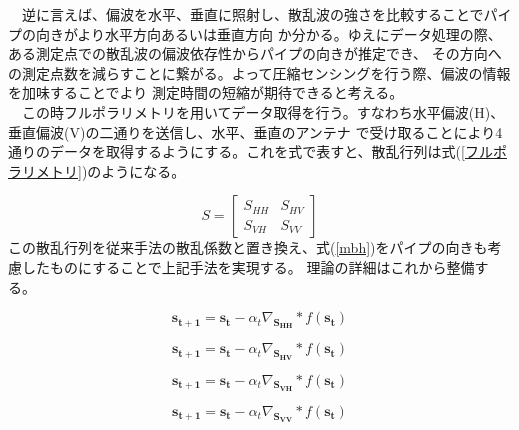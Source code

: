 \documentclass[12pt,a4paper]{jsreport}
\begin{document}
　逆に言えば、偏波を水平、垂直に照射し、散乱波の強さを比較することでパイプの向きがより水平方向あるいは垂直方向
か分かる。ゆえにデータ処理の際、ある測定点での散乱波の偏波依存性からパイプの向きが推定でき、
その方向への測定点数を減らすことに繋がる。よって圧縮センシングを行う際、偏波の情報を加味することでより
測定時間の短縮が期待できると考える。
\\　この時フルポラリメトリを用いてデータ取得を行う。すなわち水平偏波(H)、垂直偏波(V)の二通りを送信し、水平、垂直のアンテナ
で受け取ることにより4通りのデータを取得するようにする。これを式で表すと、散乱行列は式(\ref{フルポラリメトリ})のようになる。

\begin{equation}
  S =
      \left[
      \begin{array}{rrr}
      S_{HH} & S_{HV}  \\
      S_{VH} & S_{VV} 
      
      \end{array}
      \right]\label{フルポラリメトリ}
  \end{equation}
この散乱行列を従来手法の散乱係数と置き換え、式(\ref{mbh})をパイプの向きも考慮したものにすることで上記手法を実現する。
理論の詳細はこれから整備する。



\begin{equation}
  \bm{s_{t+1}}=\bm{s_{t}}-\alpha_{t}\nabla_{\bm{S_{HH}}}*f(\bm{s_{t}})
  \end{equation}

\begin{equation}
  \bm{s_{t+1}}=\bm{s_{t}}-\alpha_{t}\nabla_{\bm{S_{HV}}}*f(\bm{s_{t}})
  \end{equation}

\begin{equation}
  \bm{s_{t+1}}=\bm{s_{t}}-\alpha_{t}\nabla_{\bm{S_{VH}}}*f(\bm{s_{t}})
  \end{equation}

\begin{equation}
  \bm{s_{t+1}}=\bm{s_{t}}-\alpha_{t}\nabla_{\bm{S_{VV}}}*f(\bm{s_{t}})
  \end{equation}      







\clearpage
\end{document}
